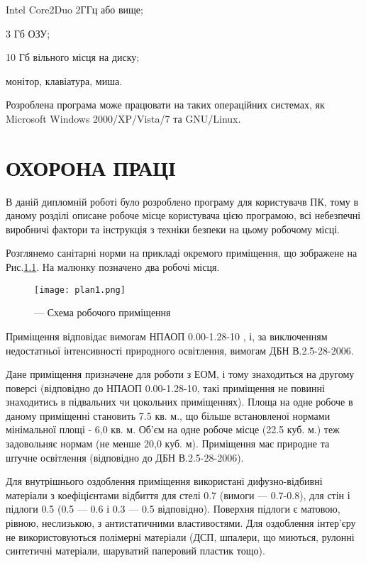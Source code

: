 \documentclass{diploma}
\begin{document}
\begin{itemizer}
\item Intel Core2Duo 2ГГц або вище;
\item 3 Гб ОЗУ;
\item 10 Гб вільного місця на диску;
\item монітор, клавіатура, миша.
\end{itemizer}


Розроблена програма може працювати на таких операційних системах, як Microsoft Windows 2000/XP/Vista/7 та GNU/Linux.


\chapter{ОХОРОНА ПРАЦІ}
\label{chap:ot}

В даній дипломній роботі було розроблено програму для користувачв ПК, тому в даному розділі описане робоче місце користувача цією програмою, всі небезпечні виробничі фактори та інструкція з техніки безпеки на цьому робочому місці.


	
Розглянемо санітарні норми на прикладі окремого приміщення, що зображене на Рис.\ref{fig:plan1}. На малюнку позначено два робочі місця.
 
\begin{figure}[ht] 
 	\centering 
 	\texttt{[image: plan1.png]} 
 	\caption{--- Схема робочого приміщення} \label{fig:plan1} 
\end{figure}


Приміщення відповідає вимогам НПАОП 0.00-1.28-10 \cite{oh1}, і, за виключенням недостатньої інтенсивності природного освітлення, вимогам ДБН В.2.5-28-2006\cite{oh2}.

Дане приміщення призначене для роботи з ЕОМ, і тому знаходиться на другому поверсі (відповідно до НПАОП 0.00-1.28-10, такі приміщення не повинні знаходитись в підвальних чи цокольних приміщеннях). Площа на одне робоче в даному приміщенні становить 7.5 кв. м., що більше встановленої нормами мінімальної площі - 6,0 кв. м. Об\rq{}єм на одне робоче місце (22.5 куб. м.) теж задовольняє нормам (не менше 20,0 куб. м). Приміщення має природне та штучне освітлення (відповідно до ДБН В.2.5-28-2006).

Для внутрішнього оздоблення приміщення використані дифузно-відбивні матеріали з коефіцієнтами відбиття для стелі 0.7 (вимоги --- 0.7-0.8), для стін і підлоги 0.5 (0.5 --- 0.6 і 0.3 --- 0.5 відповідно). Поверхня підлоги є матовою, рівною, неслизькою, з антистатичними властивостями. Для оздоблення інтер'єру не використовуються полімерні матеріали (ДСП, шпалери, що миються, рулонні синтетичні матеріали, шаруватий паперовий пластик тощо). 
\end{document}
